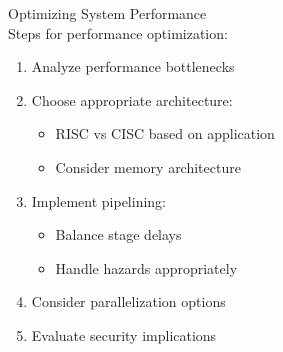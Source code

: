 \begin{KR}{Optimizing System Performance}\\
Steps for performance optimization:
\begin{enumerate}
  \item Analyze performance bottlenecks
  \item Choose appropriate architecture:
    \begin{itemize}
      \item RISC vs CISC based on application
      \item Consider memory architecture
    \end{itemize}
  \item Implement pipelining:
    \begin{itemize}
      \item Balance stage delays
      \item Handle hazards appropriately
    \end{itemize}
  \item Consider parallelization options
  \item Evaluate security implications
\end{enumerate}
\end{KR}